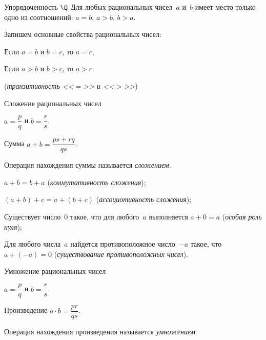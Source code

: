 \begin{mtopic}{Упорядоченность \(\Q\)}
Для любых рациональных чисел~\(a\) и~\(b\) имеет место только одно из соотношений: \(a = b\), \(a >
b\), \(b > a\).
\end{mtopic}

Запишем основные свойства рациональных чисел:

\begin{properties}
\item Если \(a = b\) и \(b = c\), то \(a = c\),

Если \(a > b\) и \(b > c\), то \(a > c\).

(\textit{транзитивность <<\(=\)>> и <<\(>\)>>})
\end{properties}

\begin{mtopic}{Сложение рациональных чисел}

\(a = \dfrac{p}{q}\) и \(b = \dfrac{r}{s}\).

Сумма \(a + b = \dfrac{ps + rq}{qs}\).

Операция нахождения суммы называется \textit{сложением}.
\end{mtopic}

\begin{properties}[resume]
\item \(a + b = b + a\) (\textit{коммутативность сложения});
\item \((a + b) + c = a + (b + c)\) (\textit{ассоциотивность сложения});
\item Существует число~\(0\) такое, что для любого~\(a\) выполняется \(a + 0 = a\) (\textit{особая
    роль нуля});
\item Для любого числа~\(a\) найдется противоположное число~\(-a\) такое, что \(a + (-a) = 0\)
    (\textit{существование противоположных чисел}).
\end{properties}

\begin{mtopic}{Умножение рациональных чисел}

\(a = \dfrac{p}{q}\) и \(b = \dfrac{r}{s}\).

Произведение \(a \cdot b = \dfrac{pr}{qs}\).

Операция нахождения произведения называется \textit{умножением}.
\end{mtopic}

